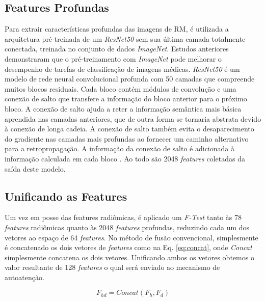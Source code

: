 \subsection{Features Profundas}
\label{subsec:cap4_features_profundas}
 
Para extrair características profundas das imagens de \gls{RM}, é utilizada a arquitetura pré-treinada de um \textit{ResNet50} sem sua última camada totalmente conectada, treinada no conjunto de dados \textit{ImageNet}. Estudos anteriores demonstraram que o pré-treinamento com \textit{ImageNet} pode melhorar o desempenho de tarefas de classificação de imagens médicas. \textit{ResNet50} é um modelo de rede neural convolucional profunda com 50 camadas que compreende muitos blocos residuais. Cada bloco contém módulos de convolução e uma conexão de salto que transfere a informação do bloco anterior para o próximo bloco. A conexão de salto ajuda a reter a informação semântica mais básica aprendida nas camadas anteriores, que de outra forma se tornaria abstrata devido à conexão de longa cadeia. A conexão de salto também evita o desaparecimento do gradiente nas camadas mais profundas ao fornecer um caminho alternativo para a retropropagação. A informação da conexão de salto é adicionada à informação calculada em cada bloco \cite{aiSelfAttentionBasedFusion2023}. Ao todo são 2048 \textit{features} coletadas da saída deste modelo.

\subsection{Unificando as Features}
\label{subsec:cap4_unificando_features}

Um vez em posse das features radiômicas, é aplicado um \textit{F-Test} tanto às 78 \textit{features} radiômicas quanto às 2048 \textit{features} profundas, reduzindo cada um dos vetores ao espaço de 64 \textit{features}. No método de fusão convencional, simplesmente é concatenado os dois vetores de \textit{features} como na Eq. \ref{eq:concat}, onde \textit{Concat} simplesmente concatena os dois vetores. Unificando ambos os vetores obtemos o valor resultante de 128 \textit{features} o qual será enviado ao mecanismo de autoatenção.

\begin{equation}
F_{hd} = \textit{Concat}(F_h, F_d)
\label{eq:concat}
\end{equation}

